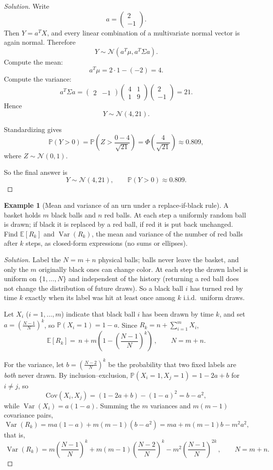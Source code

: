 \documentclass[11pt]{article}
\theoremstyle{definition}
\newtheorem{example}{Example}[section]
\newcommand{\E}{\mathbb{E}}
\newcommand{\Var}{\operatorname{Var}}
\begin{document}
\begin{proof}[Solution]
Write
\[
a=\begin{pmatrix}2\\-1\end{pmatrix}.
\]
Then $Y=a^TX$, and every linear combination of a multivariate normal vector is again normal. Therefore
\[
Y\sim \mathcal{N}(a^T\mu, a^T\Sigma a).
\]
Compute the mean:
\[
a^T\mu = 2\cdot 1 -(-2)=4.
\]
Compute the variance:
\[
a^T\Sigma a
=
\begin{pmatrix}2&-1\end{pmatrix}
\begin{pmatrix}4&1\\1&9\end{pmatrix}
\begin{pmatrix}2\\-1\end{pmatrix}
=21.
\]
Hence
\[
Y\sim \mathcal{N}(4,21).
\]

Standardizing gives
\[
\mathbb{P}(Y>0)=\mathbb{P}\left(Z>\frac{0-4}{\sqrt{21}}\right)=\Phi\left(\frac{4}{\sqrt{21}}\right)\approx 0.809,
\]
where $Z\sim \mathcal{N}(0,1)$.

So the final answer is
\[
\boxed{Y\sim \mathcal{N}(4,21), \qquad \mathbb{P}(Y>0)\approx 0.809.}
\]
\end{proof}

\begin{example}[Mean and variance of an urn under a replace-if-black rule]
A basket holds $m$ black balls and $n$ red balls. At each step a uniformly random ball is drawn; if black it is replaced by a red ball, if red it is put back unchanged. Find $\E[R_k]$ and $\Var(R_k)$, the mean and variance of the number of red balls after $k$ steps, as closed-form expressions (no sums or ellipses).
\end{example}

\begin{proof}[Solution]
Label the $N=m+n$ physical balls; balls never leave the basket, and only the $m$ originally black ones can change color. At each step the drawn label is uniform on $\{1,\dots,N\}$ and independent of the history (returning a red ball does not change the distribution of future draws). So a black ball $i$ has turned red by time $k$ exactly when its label was hit at least once among $k$ i.i.d.\ uniform draws.

Let $X_i$ ($i=1,\dots,m$) indicate that black ball $i$ has been drawn by time $k$, and set $a=\left(\frac{N-1}{N}\right)^{k}$, so $\mathbb{P}(X_i=1)=1-a$. Since $R_k=n+\sum_{i=1}^m X_i$,
\[
\E[R_k]=\boxed{\,n+m\left(1-\left(\frac{N-1}{N}\right)^{k}\right)\,}, \qquad N=m+n.
\]

For the variance, let $b=\left(\frac{N-2}{N}\right)^{k}$ be the probability that two fixed labels are \emph{both} never drawn. By inclusion--exclusion, $\mathbb{P}(X_i=1,X_j=1)=1-2a+b$ for $i\ne j$, so
\[
\mathrm{Cov}(X_i,X_j)=(1-2a+b)-(1-a)^2=b-a^2,
\]
while $\Var(X_i)=a(1-a)$. Summing the $m$ variances and $m(m-1)$ covariance pairs,
\[
\Var(R_k)=ma(1-a)+m(m-1)(b-a^2)=ma+m(m-1)b-m^2a^2,
\]
that is,
\[
\boxed{\,\Var(R_k)=m\left(\frac{N-1}{N}\right)^{k}+m(m-1)\left(\frac{N-2}{N}\right)^{k}-m^2\left(\frac{N-1}{N}\right)^{2k}\,}, \qquad N=m+n.
\]
\end{proof}
\end{document}
